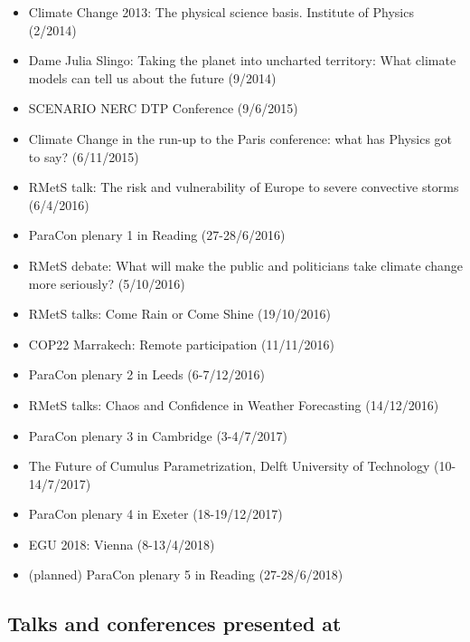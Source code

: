 \documentclass[11pt,a4paper]{article}
\begin{document}
\begin{itemize}
  \item Climate Change 2013: The physical science basis. Institute of Physics (2/2014)
  \item Dame Julia Slingo: Taking the planet into uncharted territory: What climate models can tell us about the future (9/2014)
  \item SCENARIO NERC DTP Conference (9/6/2015)
  \item Climate Change in the run-up to the Paris conference: what has Physics got to say? (6/11/2015)
  \item RMetS talk: The risk and vulnerability of Europe to severe convective storms (6/4/2016)
  \item ParaCon plenary 1 in Reading (27-28/6/2016)
  \item RMetS debate: What will make the public and politicians take climate change more seriously? (5/10/2016)
  \item RMetS talks: Come Rain or Come Shine (19/10/2016)
  \item COP22 Marrakech: Remote participation (11/11/2016)
  \item ParaCon plenary 2 in Leeds (6-7/12/2016)
  \item RMetS talks: Chaos and Confidence in Weather Forecasting (14/12/2016)
  \item ParaCon plenary 3 in Cambridge (3-4/7/2017)
  \item The Future of Cumulus Parametrization, Delft University of Technology (10-14/7/2017)
  \item ParaCon plenary 4 in Exeter (18-19/12/2017)
  \item EGU 2018: Vienna (8-13/4/2018)
  \item (planned) ParaCon plenary 5 in Reading (27-28/6/2018)
\end{itemize}

\subsection*{Talks and conferences presented at}
\end{document}

